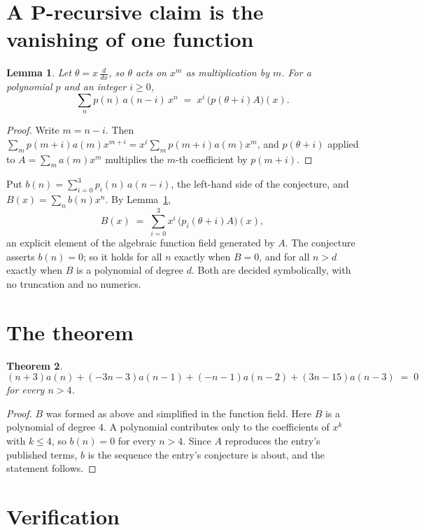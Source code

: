 \documentclass[11pt,a4paper]{article}
\theoremstyle{plain}
\newtheorem{theorem}{Theorem}
\newtheorem{lemma}[theorem]{Lemma}
\theoremstyle{definition}
\begin{document}
\section{A P-recursive claim is the vanishing of one function}

\begin{lemma}\label{lem:theta}
Let $\theta=x\,\frac{d}{dx}$, so $\theta$ acts on $x^m$ as multiplication by $m$. For a
polynomial $p$ and an integer $i\ge0$,
\[
\sum_{n} p(n)\,a(n-i)\,x^{n}\;=\;x^{i}\,\bigl(p(\theta+i)A\bigr)(x).
\]
\end{lemma}

\begin{proof}
Write $m=n-i$. Then $\sum_m p(m+i)a(m)x^{m+i}=x^i\sum_m p(m+i)a(m)x^m$, and $p(\theta+i)$
applied to $A=\sum_m a(m)x^m$ multiplies the $m$-th coefficient by $p(m+i)$.
\end{proof}

Put $b(n)=\sum_{i=0}^{3}p_i(n)\,a(n-i)$, the left-hand side of the conjecture, and
$B(x)=\sum_n b(n)x^n$. By Lemma~\ref{lem:theta},
\[
B(x)\;=\;\sum_{i=0}^{3}x^{i}\,\bigl(p_i(\theta+i)A\bigr)(x),
\]
an explicit element of the algebraic function field generated by $A$. The conjecture asserts
$b(n)=0$; so it holds for all $n$ exactly when $B=0$, and for all $n>d$ exactly when $B$ is a
polynomial of degree $d$. Both are decided symbolically, with no truncation and no numerics.

\section{The theorem}

\begin{theorem}
\[
\left(n + 3\right)a(n) + \left(- 3 n - 3\right)a(n-1) + \left(- n - 1\right)a(n-2) + \left(3 n - 15\right)a(n-3)\;=\;0
\]
for every $n>4$.
\end{theorem}

\begin{proof}
$B$ was formed as above and simplified in the function field. Here $B$ is a polynomial of degree $4$. A polynomial contributes only to the coefficients of $x^k$ with $k\le4$, so $b(n)=0$ for every $n>4$. Since $A$ reproduces the
entry's published terms, $b$ is the sequence the entry's conjecture is about, and the statement
follows.
\end{proof}

\section{Verification}
\end{document}
